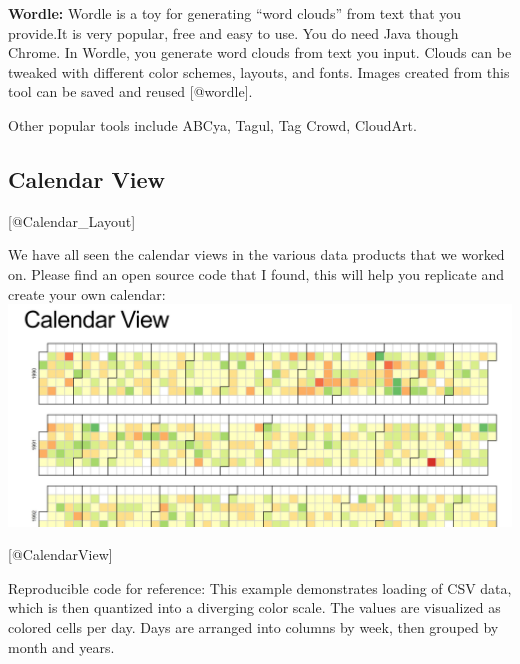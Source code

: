 \documentclass[]{book}
\theoremstyle{definition}
\theoremstyle{definition}
\theoremstyle{definition}
\theoremstyle{remark}
\begin{document}
\textbf{Wordle:} Wordle is a toy for generating ``word clouds'' from
text that you provide.It is very popular, free and easy to use. You do
need Java though Chrome. In Wordle, you generate word clouds from text
you input. Clouds can be tweaked with different color schemes, layouts,
and fonts. Images created from this tool can be saved and reused
{[}@wordle{]}.

Other popular tools include ABCya, Tagul, Tag Crowd, CloudArt.

\subsection{Calendar View}\label{calendar-view}

{[}@Calendar\_Layout{]}

We have all seen the calendar views in the various data products that we
worked on. Please find an open source code that I found, this will help
you replicate and create your own calendar:
\includegraphics{images/CalendarView.jpg}

{[}@CalendarView{]}

Reproducible code for reference: This example demonstrates loading of
CSV data, which is then quantized into a diverging color scale. The
values are visualized as colored cells per day. Days are arranged into
columns by week, then grouped by month and years.
\end{document}
